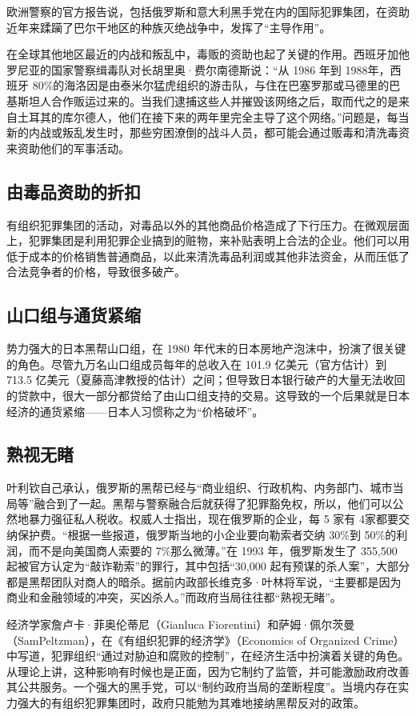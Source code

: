 欧洲警察的官方报告说，包括俄罗斯和意大利黑手党在内的国际犯罪集团，在资助近年来蹂躏了巴尔干地区的种族灭绝战争中，发挥了“主导作用”。

在全球其他地区最近的内战和叛乱中，毒贩的资助也起了关键的作用。西班牙加他罗尼亚的国家警察缉毒队对长胡里奥·费尔南德斯说：“从 1986 年到 1988年，西班牙 80\%的海洛因是由泰米尔猛虎组织的游击队，与住在巴塞罗那或马德里的巴基斯坦人合作贩运过来的。当我们逮捕这些人并摧毁该网络之后，取而代之的是来自土耳其的库尔德人，他们在接下来的两年里完全主导了这个网络。”问题是，每当新的内战或叛乱发生时，那些穷困潦倒的战斗人员，都可能会通过贩毒和清洗毒资来资助他们的军事活动。

\subsection{由毒品资助的折扣}
有组织犯罪集团的活动，对毒品以外的其他商品价格造成了下行压力。在微观层面上，犯罪集团是利用犯罪企业搞到的赃物，来补贴表明上合法的企业。他们可以用低于成本的价格销售普通商品，以此来清洗毒品利润或其他非法资金，从而压低了合法竞争者的价格，导致很多破产。

\subsection{山口组与通货紧缩}
势力强大的日本黑帮山口组，在 1980 年代末的日本房地产泡沫中，扮演了很关键的角色。尽管九万名山口组成员每年的总收入在 101.9 亿美元（官方估计）到713.5 亿美元（夏藤高津教授的估计）之间；但导致日本银行破产的大量无法收回的贷款中，很大一部分都贷给了由山口组支持的交易。这导致的一个后果就是日本经济的通货紧缩——日本人习惯称之为“价格破坏”。

\subsection{熟视无睹}
叶利钦自己承认，俄罗斯的黑帮已经与“商业组织、行政机构、内务部门、城市当局等”融合到了一起。黑帮与警察融合后就获得了犯罪豁免权，所以，他们可以公然地暴力强征私人税收。权威人士指出，现在俄罗斯的企业，每 5 家有 4家都要交纳保护费。“根据一些报道，俄罗斯当地的小企业要向勒索者交纳 30\%到 50\%的利润，而不是向美国商人索要的 7\%那么微薄。”在 1993 年，俄罗斯发生了 355,500 起被官方认定为“敲诈勒索”的罪行，其中包括“30,000 起有预谋的杀人案”，大部分都是黑帮团队对商人的暗杀。据前内政部长维克多·叶林将军说，“主要都是因为商业和金融领域的冲突，买凶杀人。”而政府当局往往都“熟视无睹”。

经济学家詹卢卡·菲奥伦蒂尼（Gianluca Fiorentini）和萨姆·佩尔茨曼（SamPeltzman），在《有组织犯罪的经济学》（Economics of Organized Crime）中写道，犯罪组织“通过对胁迫和腐败的控制”，在经济生活中扮演着关键的角色。从理论上讲，这种影响有时候也是正面，因为它制约了监管，并可能激励政府改善其公共服务。一个强大的黑手党，可以“制约政府当局的垄断程度”。当境内存在实力强大的有组织犯罪集团时，政府只能勉为其难地接纳黑帮反对的政策。

